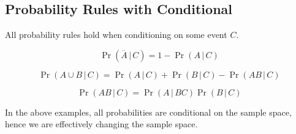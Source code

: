 \documentclass{article}
\begin{document}
\subsection{Probability Rules with Conditional}
All probability rules hold when conditioning on some event \(C\).
\begin{theorem}
    \begin{equation*}
        \Pr{\left( \overline{A} \,\vert\, C \right)} = 1 - \Pr{\left( A \,\vert\, C \right)}
    \end{equation*}
\end{theorem}
\begin{theorem}
    \begin{equation*}
        \Pr{\left( A \cup B \,\vert\, C \right)} = \Pr{\left( A \,\vert\, C \right)} + \Pr{\left( B \,\vert\, C \right)} - \Pr{\left( AB \,\vert\, C \right)}
    \end{equation*}
\end{theorem}
\begin{theorem}
    \begin{equation*}
        \Pr{\left( A B \,\vert\, C \right)} = \Pr{\left( A \,\vert\, BC \right)} \Pr{\left( B \,\vert\, C \right)}
    \end{equation*}
\end{theorem}
In the above examples, all probabilities are conditional on the sample space, hence we are effectively
changing the sample space.
\end{document}
